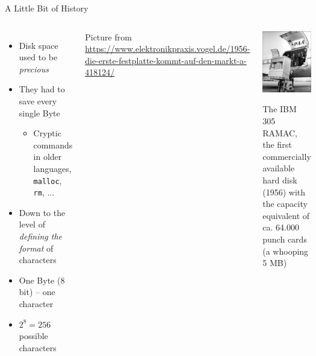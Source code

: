 \begin{frame}{A Little Bit of History}
%
\begin{columns}
\begin{itemize}
\item Disk space used to be \emph{precious}
\item They had to save every single Byte
	\begin{itemize}
	\item[\thus] Cryptic commands in older languages, \eg \texttt{malloc}, \texttt{rm}, ...
	\end{itemize}
\item Down to the level of \emph{defining the format} of characters
\item One Byte (8 bit) -- one character
\item[\Thus] $2^8 = 256$ possible characters
\end{itemize}

{\tiny Picture from \url{https://www.elektronikpraxis.vogel.de/1956-die-erste-festplatte-kommt-auf-den-markt-a-418124/}}
%
\begin{center}
\includegraphics[width=.5\linewidth]{./gfx/IBM-305-RAMAC}

{
\scriptsize
The IBM 305 RAMAC, the first commercially available hard disk (1956) with the capacity equivalent of ca. 64.000 punch cards (a whooping 5 MB)
}
\end{center}
\end{columns}
%
\end{frame}



